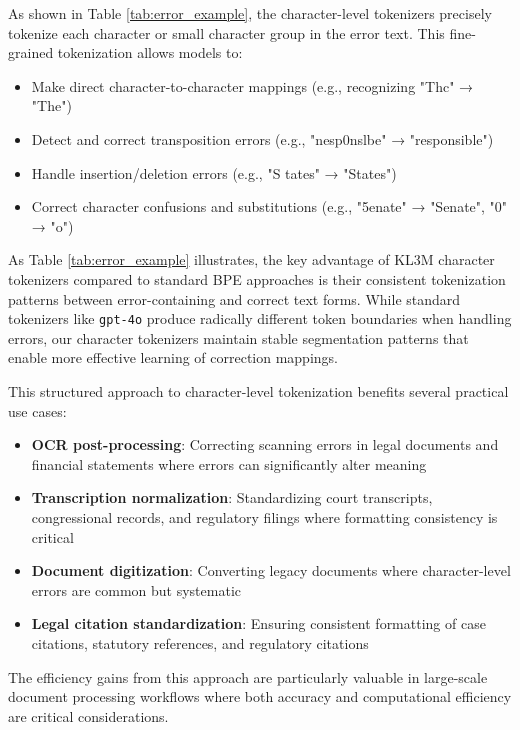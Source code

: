 As shown in Table \ref{tab:error_example}, the character-level tokenizers precisely tokenize each character or small character group in the error text. This fine-grained tokenization allows models to:

\begin{itemize}
    \item Make direct character-to-character mappings (e.g., recognizing "Thc" → "The")
    \item Detect and correct transposition errors (e.g., "nesp0nslbe" → "responsible")
    \item Handle insertion/deletion errors (e.g., "S tates" → "States")
    \item Correct character confusions and substitutions (e.g., "5enate" → "Senate", "0" → "o")
\end{itemize}

As Table \ref{tab:error_example} illustrates, the key advantage of KL3M character tokenizers compared to standard BPE approaches is their consistent tokenization patterns between error-containing and correct text forms. While standard tokenizers like \texttt{gpt-4o} produce radically different token boundaries when handling errors, our character tokenizers maintain stable segmentation patterns that enable more effective learning of correction mappings.

This structured approach to character-level tokenization benefits several practical use cases:

\begin{itemize}
    \item \textbf{OCR post-processing}: Correcting scanning errors in legal documents and financial statements where errors can significantly alter meaning
    \item \textbf{Transcription normalization}: Standardizing court transcripts, congressional records, and regulatory filings where formatting consistency is critical
    \item \textbf{Document digitization}: Converting legacy documents where character-level errors are common but systematic
    \item \textbf{Legal citation standardization}: Ensuring consistent formatting of case citations, statutory references, and regulatory citations
\end{itemize}

The efficiency gains from this approach are particularly valuable in large-scale document processing workflows where both accuracy and computational efficiency are critical considerations.